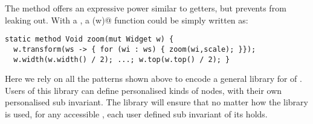The \Q@transform@ method offers an expressive power similar to \Q@mut@ getters, but prevents \Q@Widgets@ from leaking out.  With a \Q@Transformer@, a \Q@zoom(w)@ function could be simply written as:
\begin{lstlisting}
static method Void zoom(mut Widget w) {
  w.transform(ws -> { for (wi : ws) { zoom(wi,scale); }});
  w.width(w.width() / 2); ...; w.top(w.top() / 2); }
\end{lstlisting}






Here we rely on all the patterns shown above to encode a general library for \Q@Graph@s
of \Q@Node@s.
Users of this library can define personalised kinds of nodes,
with their own personalised sub invariant.
The library will ensure that no matter how the library is used, for any accessible \Q@Graph@, each user defined sub invariant of its \Q@Node@s holds.


